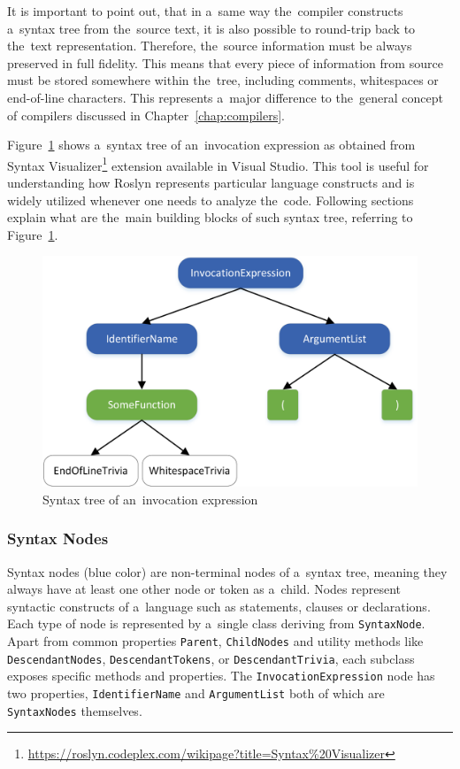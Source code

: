 \documentclass[
  digital, %
  table,   %
  lof,     %
  lot,     %
  oneside,
]{fithesis3}
\begin{document}
It is important to point out, that in a~same way the~compiler constructs a~syntax tree from the~source text, it is also possible to round-trip back to the~text representation. Therefore, the~source information must be always preserved in full fidelity. This means that every piece of information from source must be stored somewhere within the~tree, including comments, whitespaces or end-of-line characters. This represents a~major difference to the~general concept of compilers discussed in Chapter~\ref{chap:compilers}.

Figure~\ref{fig:roslyn-syntax-tree} shows a~syntax tree of an~invocation expression as obtained from Syntax Visualizer\footnote{\url{https://roslyn.codeplex.com/wikipage?title=Syntax\%20Visualizer}} extension available in Visual Studio. This tool is useful for understanding how Roslyn represents particular language constructs and is widely utilized whenever one needs to analyze the~code. Following sections explain what are the~main building blocks of such syntax tree, referring to Figure~\ref{fig:roslyn-syntax-tree}.

\begin{figure}[h!]
		\centering
			\includegraphics[scale=0.85]{img/roslyn-syntax-tree}
		\caption{Syntax tree of an~invocation expression}
		\label{fig:roslyn-syntax-tree}
\end{figure}

\subsubsection{\textbf{Syntax Nodes}}
Syntax nodes (blue color) are non-terminal nodes of a~syntax tree, meaning they always have at least one other node or token as a~child. Nodes represent syntactic constructs of a~language such as statements, clauses or declarations. Each type of node is represented by a~single class deriving from \texttt{SyntaxNode}. Apart from common properties \texttt{Parent}, \texttt{ChildNodes} and utility methods like \texttt{DescendantNodes}, \texttt{DescendantTokens}, or \texttt{DescendantTrivia}, each subclass exposes specific methods and properties. The \texttt{InvocationExpression} node has two properties, \texttt{IdentifierName} and \texttt{ArgumentList} both of which are \texttt{SyntaxNodes} themselves.
 
\end{document}
